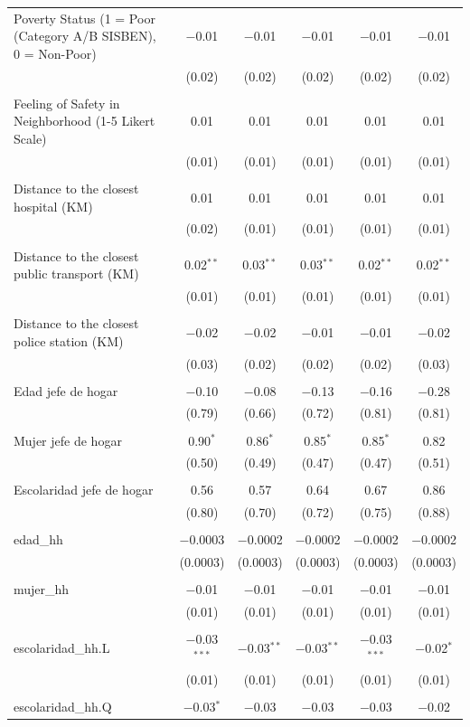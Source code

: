 \begin{table}[H]
\begin{tabularx}{0.9\textwidth}{@{\extracolsep{-7pt}}lccccc}
 Poverty Status (1 = Poor (Category A/B SISBEN), 0 = Non-Poor) & $-$0.01 & $-$0.01 & $-$0.01 & $-$0.01 & $-$0.01 \\    & (0.02) & (0.02) & (0.02) & (0.02) & (0.02) \\    & & & & & \\   Feeling of Safety in Neighborhood (1-5 Likert Scale) & 0.01 & 0.01 & 0.01 & 0.01 & 0.01 \\    & (0.01) & (0.01) & (0.01) & (0.01) & (0.01) \\    & & & & & \\   Distance to the closest hospital (KM) & 0.01 & 0.01 & 0.01 & 0.01 & 0.01 \\    & (0.02) & (0.01) & (0.01) & (0.01) & (0.01) \\    & & & & & \\   Distance to the closest public transport  (KM) & 0.02$^{**}$ & 0.03$^{**}$ & 0.03$^{**}$ & 0.02$^{**}$ & 0.02$^{**}$ \\    & (0.01) & (0.01) & (0.01) & (0.01) & (0.01) \\    & & & & & \\   Distance to the closest police station (KM) & $-$0.02 & $-$0.02 & $-$0.01 & $-$0.01 & $-$0.02 \\    & (0.03) & (0.02) & (0.02) & (0.02) & (0.03) \\    & & & & & \\   Edad jefe de hogar & $-$0.10 & $-$0.08 & $-$0.13 & $-$0.16 & $-$0.28 \\    & (0.79) & (0.66) & (0.72) & (0.81) & (0.81) \\    & & & & & \\   Mujer jefe de hogar & 0.90$^{*}$ & 0.86$^{*}$ & 0.85$^{*}$ & 0.85$^{*}$ & 0.82 \\    & (0.50) & (0.49) & (0.47) & (0.47) & (0.51) \\    & & & & & \\   Escolaridad jefe de hogar & 0.56 & 0.57 & 0.64 & 0.67 & 0.86 \\    & (0.80) & (0.70) & (0.72) & (0.75) & (0.88) \\    & & & & & \\   edad\_hh & $-$0.0003 & $-$0.0002 & $-$0.0002 & $-$0.0002 & $-$0.0002 \\    & (0.0003) & (0.0003) & (0.0003) & (0.0003) & (0.0003) \\    & & & & & \\   mujer\_hh & $-$0.01 & $-$0.01 & $-$0.01 & $-$0.01 & $-$0.01 \\    & (0.01) & (0.01) & (0.01) & (0.01) & (0.01) \\    & & & & & \\   escolaridad\_hh.L & $-$0.03$^{***}$ & $-$0.03$^{**}$ & $-$0.03$^{**}$ & $-$0.03$^{***}$ & $-$0.02$^{*}$ \\    & (0.01) & (0.01) & (0.01) & (0.01) & (0.01) \\    & & & & & \\   escolaridad\_hh.Q & $-$0.03$^{*}$ & $-$0.03 & $-$0.03 & $-$0.03 & $-$0.02 \\   
\end{tabularx}
\end{table}
